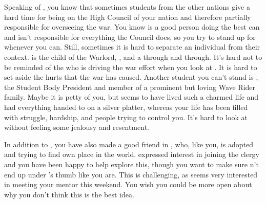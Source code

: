 \documentclass[char]{GL2020}
\begin{document}
Speaking of \cTechStar{}, you know that sometimes students from the other nations give \cTechStar{\them} a hard time for being on the High Council of your nation and therefore partially responsible for overseeing the war. You know \cTechStar{} is a good person doing the best \cTechStar{\they} can and isn't responsible for everything the Council does, so you try to stand up for \cTechStar{\them} whenever you can. Still, sometimes it is hard to separate an individual from their context. \cWarlordDaughter{\full} is the child of the \pShippie{} Warlord, \cLoud{\full}, and a \pShippie{} through and through. It's hard not to be reminded of the \cLoud{\person} who is driving the war effort when you look at \cWarlordDaughter{\them}. It is hard to set aside the hurts that the war has caused. Another student you can’t stand is \cPresident{\full}, the Student Body President and member of a prominent but loving Wave Rider family. Maybe it is petty of you, but \cPresident{} seems to have lived such a charmed life and had everything handed to \cPresident{\them} on a silver platter, whereas your life has been filled with struggle, hardship, and people trying to control you. It’s hard to look at \cPresident{} without feeling some jealousy and resentment.

In addition to \cTechStar{}, you have also made a good friend in \cAmbition{\full}, who, like you, is adopted and trying to find \cAmbition{\their} own place in the world. \cAmbition{\They} \cAmbition{\have} expressed interest in joining the clergy and you have been happy to help \cAmbition{\them} explore this, though you want to make sure \cAmbition{\they} \cAmbition{\do}n't end up under \cAntiChup{}’s thumb like you are. This is challenging, as \cAmbition{\they} seems very interested in meeting your mentor this weekend. You wish you could be more open about why you don’t think this is the best idea.
\end{document}
